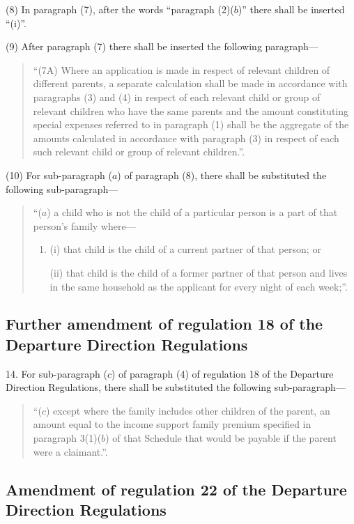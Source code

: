 \documentclass[12pt,a4paper]{article}
\begin{document}
(8) In paragraph (7), after the words “paragraph (2)($b$)” there shall be inserted “(i)”.

(9) After paragraph (7) there shall be inserted the following paragraph—
\begin{quotation}
“(7A) Where an application is made in respect of relevant children of different parents, a separate calculation shall be made in accordance with paragraphs (3) and (4) in respect of each relevant child or group of relevant children who have the same parents and the amount constituting special expenses referred to in paragraph (1) shall be the aggregate of the amounts calculated in accordance with paragraph (3) in respect of each such relevant child or group of relevant children.”.
\end{quotation}

(10) For sub-paragraph ($a$) of paragraph (8), there shall be substituted the following sub-paragraph—
\begin{quotation}
“($a$) a child who is not the child of a particular person is a part of that person’s family where—
\begin{enumerate}\item[]
(i) that child is the child of a current partner of that person; or

(ii) that child is the child of a former partner of that person and lives in the same household as the applicant for every night of each week;”.
\end{enumerate}
\end{quotation}

\subsection[14. Further amendment of regulation 18 of the Departure Direction Regulations]{Further amendment of regulation 18 of the Departure Direction Regulations}

14.  For sub-paragraph ($c$) of paragraph (4) of regulation 18 of the Departure Direction Regulations, there shall be substituted the following sub-paragraph—
\begin{quotation}
“($c$) except where the family includes other children of the parent, an amount equal to the income support family premium specified in paragraph 3(1)($b$) of that Schedule that would be payable if the parent were a claimant.”.
\end{quotation}

\subsection[15. Amendment of regulation 22 of the Departure Direction Regulations]{Amendment of regulation 22 of the Departure Direction Regulations}
\end{document}

